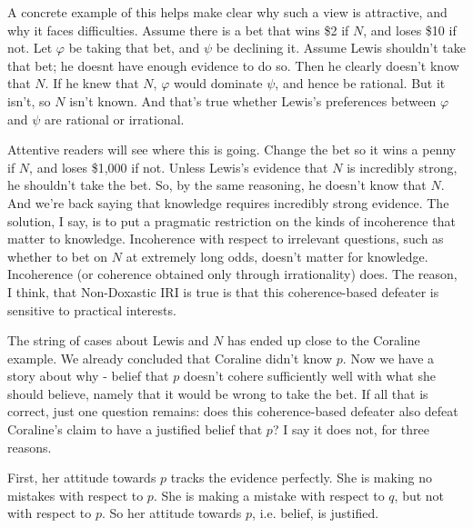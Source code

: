 A concrete example of this helps make clear why such a view is attractive, and why it faces difficulties. Assume there is a bet that wins \$2 if $N$, and loses \$10 if not. Let $\varphi$ be taking that bet, and $\psi$ be declining it. Assume Lewis shouldn't take that bet; he doesnt have enough evidence to do so. Then he clearly doesn't know that $N$. If he knew that $N$, $\varphi$ would dominate $\psi$, and hence be rational. But it isn't, so $N$ isn't known. And that's true whether Lewis's preferences between $\varphi$ and $\psi$ are rational or irrational.

Attentive readers will see where this is going. Change the bet so it wins a penny if $N$, and loses \$1,000 if not. Unless Lewis's evidence that $N$ is incredibly strong, he shouldn't take the bet. So, by the same reasoning, he doesn't know that $N$. And we're back saying that knowledge requires incredibly strong evidence. The solution, I say, is to put a pragmatic restriction on the kinds of incoherence that matter to knowledge. Incoherence with respect to irrelevant questions, such as whether to bet on $N$ at extremely long odds, doesn't matter for knowledge. Incoherence (or coherence obtained only through irrationality) does. The reason, I think, that Non-Doxastic IRI is true is that this coherence-based defeater is sensitive to practical interests.

The string of cases about Lewis and $N$ has ended up close to the Coraline example. We already concluded that Coraline didn't know $p$. Now we have a story about why - belief that $p$ doesn't cohere sufficiently well with what she should believe, namely that it would be wrong to take the bet. If all that is correct, just one question remains: does this coherence-based defeater also defeat Coraline's claim to have a justified belief that $p$? I say it does not, for three reasons.

First, her attitude towards \(p\) tracks the evidence perfectly. She is making no mistakes with respect to \(p\). She is making a mistake with respect to \(q\), but not with respect to \(p\). So her attitude towards \(p\), i.e. belief, is justified.

